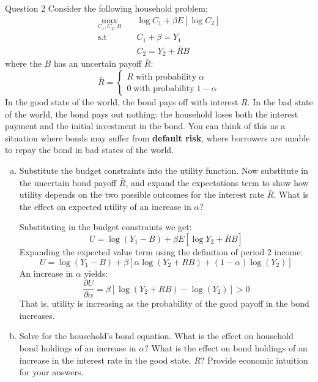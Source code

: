 \documentclass[a4paper]{article}
\newif\IfInSansMode
\begin{document}
	\begin{questionbox}{Question 2}
		Consider the following household problem:
		\begin{align*}
			\max_{C_1,C_2,B} \quad &\log C_1 + \beta E[\log C_2]\\
			\text{s.t} \quad &C_1 + \beta = Y_1\\
			&C_2 = Y_2 + \bar{R}B
		\end{align*}
		where the \( B \) has an uncertain payoff \( \bar{R} \):
		\[
			\bar{R}=
			\begin{cases}
				R \;\text{with probability}\; \alpha\\
				0 \;\text{with probability}\; 1 - \alpha
			\end{cases}
		\]
		In the good state of the world, the bond pays oﬀ with interest \( R \). In the bad state of the world, the bond pays out nothing: the household loses both the interest payment and the initial investment in the bond. You can think of this as a situation where bonds may suﬀer from \textbf{default risk}, where borrowers are unable to repay the bond in bad states of the world.
			\begin{enumerate}[(a)]
				\item Substitute the budget constraints into the utility function. Now substitute in the uncertain bond payoff \( \bar{R} \), and expand the expectations term to show how utility depends on the two possible outcomes for the interest rate \( \bar{R} \). What is the eﬀect on expected utility of an increase in \( \alpha \)?
				\begin{explanationbox}
					Substituting in the budget constraints we get:
					\[
						U = \log (Y_1 - B) + \beta E\left[ \log Y_2 + \bar{R} B \right]
					\]
					Expanding the expected value term using the deﬁnition of period 2 income:
					\[
						U = \log (Y_1 - B) + \beta \left[ \alpha \log (Y_2 + RB) + (1-\alpha)\log (Y_2) \right]
					\]
					An increase in \( \alpha \) yields:
					\[
						\frac{\partial U}{\partial \alpha} = \beta [\log (Y_2 + RB) - \log(Y_2)] > 0
					\]
					That is, utility is increasing as the probability of the good payoﬀ in the bond increases.
				\end{explanationbox}
				\item Solve for the household’s bond equation. What is the eﬀect on household bond holdings of an increase in \( \alpha \)? What is the eﬀect on bond holdings of an increase in the interest rate in the good state, \( R \)? Provide economic intuition for your answers.
				\begin{explanationbox}

\end{explanationbox}
\end{enumerate}
\end{questionbox}
\end{document}
